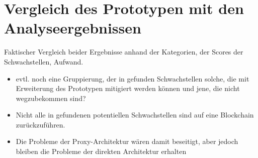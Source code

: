 \section{Vergleich des Prototypen mit den Analyseergebnissen}
\label{sec:comparison}
    Faktischer Vergleich beider Ergebnisse anhand der Kategorien, der Scores der Schwachstellen, Aufwand.
    \begin{itemize}[noitemsep]
        \item evtl. noch eine Gruppierung, der in  gefunden Schwachstellen solche, die mit Erweiterung des Prototypen mitigiert werden können und jene, die nicht wegzubekommen sind?
        \item Nicht alle in  gefundenen potentiellen Schwachstellen sind auf eine Blockchain zurückzuführen.
        \item Die Probleme der Proxy-Architektur wären damit beseitigt, aber jedoch bleiben die Probleme der direkten Architektur erhalten
    \end{itemize}
    
    